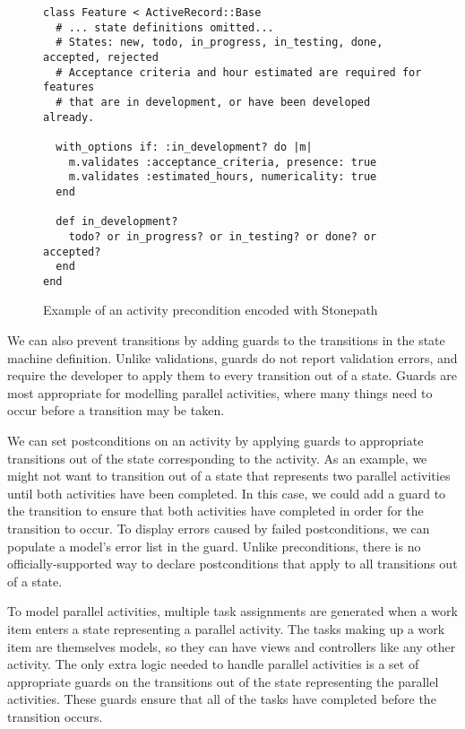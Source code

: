 \documentclass[document.tex]{subfiles}
\begin{document}
\begin{figure}[!ht]
  \caption{Example of an activity precondition encoded with Stonepath}
  \label{fig:stonepath-precondition}
  \begin{lstlisting}
class Feature < ActiveRecord::Base
  # ... state definitions omitted...
  # States: new, todo, in_progress, in_testing, done, accepted, rejected
  # Acceptance criteria and hour estimated are required for features
  # that are in development, or have been developed already.

  with_options if: :in_development? do |m|
    m.validates :acceptance_criteria, presence: true
    m.validates :estimated_hours, numericality: true
  end

  def in_development?
    todo? or in_progress? or in_testing? or done? or accepted?
  end
end
  \end{lstlisting}
\end{figure}

We can also prevent transitions by adding guards to the transitions in the state machine definition. Unlike validations, guards do not report validation errors, and require the developer to apply them to every transition out of a state. Guards are most appropriate for modelling parallel activities, where many things need to occur before a transition may be taken.


We can set postconditions on an activity by applying guards to appropriate transitions out of the state corresponding to the activity. As an example, we might not want to transition out of a state that represents two parallel activities until both activities have been completed. In this case, we could add a guard to the transition to ensure that both activities have completed in order for the transition to occur. To display errors caused by failed postconditions, we can populate a model's error list in the guard. Unlike preconditions, there is no officially-supported way to declare postconditions that apply to all transitions out of a state.


To model parallel activities, multiple task assignments are generated when a work item enters a state representing a parallel activity. The tasks making up a work item are themselves models, so they can have views and controllers like any other activity. The only extra logic needed to handle parallel activities is a set of appropriate guards on the transitions out of the state representing the parallel activities. These guards ensure that all of the tasks have completed before the transition occurs.
\end{document}
